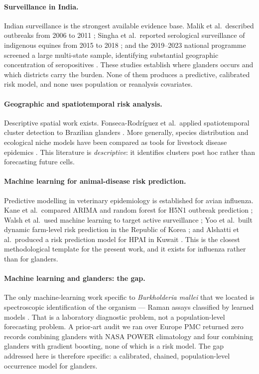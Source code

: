 \documentclass[11pt]{article}
\begin{document}
\paragraph{Surveillance in India.}
Indian surveillance is the strongest available evidence base. Malik et al.\ described
outbreaks from 2006 to 2011 \cite{malik2012}; Singha et al.\ reported serological
surveillance of indigenous equines from 2015 to 2018 \cite{singha2020}; and the
2019--2023 national programme screened a large multi-state sample, identifying substantial
geographic concentration of seropositives \cite{singha2026}. These studies establish where
glanders occurs and which districts carry the burden. None of them produces a predictive,
calibrated risk model, and none uses population or reanalysis covariates.

\paragraph{Geographic and spatiotemporal risk analysis.}
Descriptive spatial work exists. Fonseca-Rodr\'iguez et al.\ applied spatiotemporal cluster
detection to Brazilian glanders \cite{fonseca2019}. More generally, species distribution
and ecological niche models have been compared as tools for livestock disease
epidemics \cite{hollings2017}. This literature is \emph{descriptive}: it identifies
clusters post hoc rather than forecasting future cells.

\paragraph{Machine learning for animal-disease risk prediction.}
Predictive modelling in veterinary epidemiology is established for avian influenza.
Kane et al.\ compared ARIMA and random forest for H5N1 outbreak prediction
\cite{kane2014}; Walsh et al.\ used machine learning to target active surveillance
\cite{walsh2019}; Yoo et al.\ built dynamic farm-level risk prediction in the Republic of
Korea \cite{yoo2022}; and Alshatti et al.\ produced a risk prediction model for HPAI in
Kuwait \cite{alshatti2026}. This is the closest methodological template for the present
work, and it exists for influenza rather than for glanders.

\paragraph{Machine learning and glanders: the gap.}
The only machine-learning work specific to \emph{Burkholderia mallei} that we located is
spectroscopic identification of the organism --- Raman assays classified by learned
models \cite{moawad2019,stoeckel2015}. That is a laboratory diagnostic problem, not a
population-level forecasting problem. A prior-art audit we ran over Europe PMC
returned zero records combining glanders with NASA POWER
climatology and four combining glanders with gradient boosting, none of which is a risk
model. The gap addressed here is therefore specific: a calibrated, chained,
population-level occurrence model for glanders.
\end{document}
